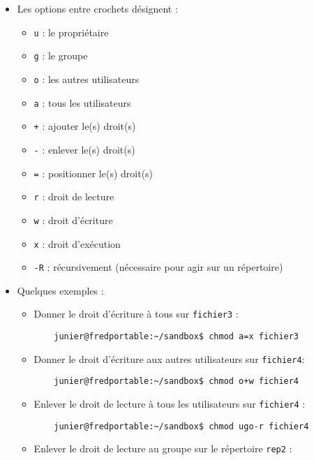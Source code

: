 \documentclass[
  11pt,
]{article}
\providecommand{\tightlist}{%
  \setlength{\itemsep}{0pt}\setlength{\parskip}{0pt}}
\newcounter{prop}
\begin{document}
\begin{enumerate}
  \begin{itemize}
  \tightlist
  \item
    Les options entre crochets désignent :

    \begin{itemize}
    \tightlist
    \item
      \texttt{u} : le propriétaire
    \item
      \texttt{g} : le groupe
    \item
      \texttt{o} : les autres utilisateurs
    \item
      \texttt{a} : tous les utilisateurs
    \item
      \texttt{+} : ajouter le(s) droit(s)
    \item
      \texttt{-} : enlever le(s) droit(s)
    \item
      \texttt{=} : positionner le(s) droit(s)
    \item
      \texttt{r} : droit de lecture
    \item
      \texttt{w} : droit d'écriture
    \item
      \texttt{x} : droit d'exécution
    \item
      \texttt{-R} : récursivement (nécessaire pour agir sur un
      répertoire)
    \end{itemize}
  \item
    Quelques exemples :

    \begin{itemize}
    \item
      Donner le droit d'écriture à tous sur \texttt{fichier3} :

\begin{verbatim}
    junier@fredportable:~/sandbox$ chmod a=x fichier3
\end{verbatim}
    \item
      Donner le droit d'écriture aux autres utilisateurs sur
      \texttt{fichier4}:

\begin{verbatim}
    junier@fredportable:~/sandbox$ chmod o+w fichier4
\end{verbatim}
    \item
      Enlever le droit de lecture à tous les utilisateurs sur
      \texttt{fichier4} :

\begin{verbatim}
    junier@fredportable:~/sandbox$ chmod ugo-r fichier4
\end{verbatim}
    \item
      Enlever le droit de lecture au groupe sur le répertoire
      \texttt{rep2} :


\end{itemize}
\end{itemize}
\end{enumerate}
\end{document}
